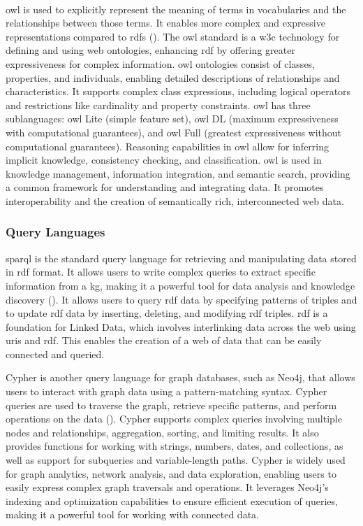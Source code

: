 \\\gls{owl} is used to explicitly represent the meaning of terms in vocabularies and the relationships between those terms. It enables more complex and expressive representations compared to \gls{rdfs} (\cite{Deborah2004}).
The \gls{owl} standard is a \gls{w3c} technology for defining and using web ontologies, enhancing \gls{rdf} by offering greater expressiveness for complex information. \gls{owl} ontologies consist of classes, properties, and individuals, enabling detailed descriptions of relationships and characteristics. It supports complex class expressions, including logical operators and restrictions like cardinality and property constraints.
\gls{owl} has three sublanguages: \gls{owl} Lite (simple feature set), \gls{owl} DL (maximum expressiveness with computational guarantees), and \gls{owl} Full (greatest expressiveness without computational guarantees). Reasoning capabilities in \gls{owl} allow for inferring implicit knowledge, consistency checking, and classification.
\gls{owl} is used in knowledge management, information integration, and semantic search, providing a common framework for understanding and integrating data. It promotes interoperability and the creation of semantically rich, interconnected web data.

\subsubsection*{Query Languages}
\gls{sparql} is the standard query language for retrieving and manipulating data stored in \gls{rdf} format. It allows users to write complex queries to extract specific information from a \gls{kg}, making it a powerful tool for data analysis and knowledge discovery (\cite{Jorge2009}).
It allows users to query \gls{rdf} data by specifying patterns of triples and to update \gls{rdf} data by inserting, deleting, and modifying \gls{rdf} triples. \gls{rdf} is a foundation for Linked Data, which involves interlinking data across the web using \glspl{uri} and \gls{rdf}. This enables the creation of a web of data that can be easily connected and queried.

Cypher is another query language for graph databases, such as Neo4j, that allows users to interact with graph data using a pattern-matching syntax. Cypher queries are used to traverse the graph, retrieve specific patterns, and perform operations on the data (\cite{Francis2018}).
Cypher supports complex queries involving multiple nodes and relationships, aggregation, sorting, and limiting results. It also provides functions for working with strings, numbers, dates, and collections, as well as support for subqueries and variable-length paths.
Cypher is widely used for graph analytics, network analysis, and data exploration, enabling users to easily express complex graph traversals and operations. It leverages Neo4j's indexing and optimization capabilities to ensure efficient execution of queries, making it a powerful tool for working with connected data.

